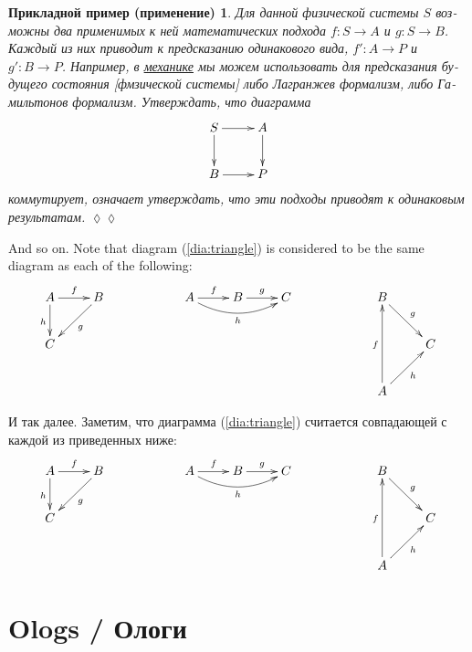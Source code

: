 \documentclass[a4paper]{book}
\def\to{\rightarrow}
\def\taking{\colon}
\theoremstyle{myth}
\newtheorem{appRUS}[envRUS]{Прикладной пример (применение)}
\newenvironment{applicationRUS}{\begin{appRUS}}{\hspace*{\fill}$\lozenge\lozenge$\end{appRUS}}
\begin{document}
\begin{russian}
\begin{applicationRUS}
Для данной физической системы $S$ возможны два применимых к ней математических подхода $f\taking S\to A$ и $g\taking S\to B$. Каждый из них приводит к предсказанию одинакового вида, $f'\taking A\to P$ и $g'\taking B\to P$. Например, в \href{https://ru.wikipedia.org/wiki/%D0%93%D0%B0%D0%BC%D0%B8%D0%BB%D1%8C%D1%82%D0%BE%D0%BD%D0%BE%D0%B2%D0%B0_%D0%BC%D0%B5%D1%85%D0%B0%D0%BD%D0%B8%D0%BA%D0%B0#.D0.9F.D0.B5.D1.80.D0.B5.D1.84.D0.BE.D1.80.D0.BC.D1.83.D0.BB.D0.B8.D1.80.D0.BE.D0.B2.D0.BA.D0.B0_.D0.BB.D0.B0.D0.B3.D1.80.D0.B0.D0.BD.D0.B6.D0.B5.D0.B2.D0.BE.D0.B9_.D0.BC.D0.B5.D1.85.D0.B0.D0.BD.D0.B8.D0.BA.D0.B8}{\text механике} мы можем использовать для предсказания будущего состояния [фмзической системы] либо Лагранжев формализм, либо Гамильтонов формализм. Утверждать, что диаграмма 
$$
\xymatrix{S\ar[r]\ar[d]&A\ar[d]\\B\ar[r]&P}
$$
коммутирует, означает утверждать, что эти подходы приводят к одинаковым результатам.
\end{applicationRUS}

And so on. Note that diagram (\ref{dia:triangle}) is considered to be the same diagram as each of the following:
$$
\xymatrix{A\ar[r]^f\ar[d]_h&B\ar[dl]^g\\C}\hspace{.8in}
\xymatrix{A\ar[r]^f\ar@/_1pc/[rr]_h&B\ar[r]^g&C}\hspace{.8in}
\xymatrix{B\ar[rd]^g\\&C\\A\ar[ru]_h\ar[uu]^f}$$
 
И так далее. Заметим, что диаграмма (\ref{dia:triangle}) считается совпадающей с каждой из приведенных ниже:
$$
\xymatrix{A\ar[r]^f\ar[d]_h&B\ar[dl]^g\\C}\hspace{.8in}
\xymatrix{A\ar[r]^f\ar@/_1pc/[rr]_h&B\ar[r]^g&C}\hspace{.8in}
\xymatrix{B\ar[rd]^g\\&C\\A\ar[ru]_h\ar[uu]^f}$$


\section{Ologs / Ологи}\label{sec:ologs}


\end{russian}
\end{document}
